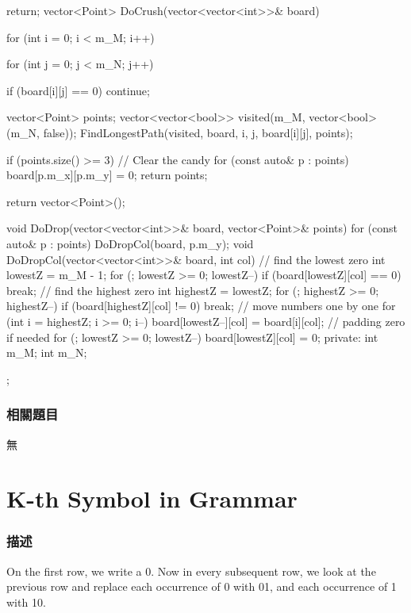 \begin{Code}
{{        return;
    }
    vector<Point> DoCrush(vector<vector<int>>& board)
    {
        for (int i = 0; i < m_M; i++)
        {
            for (int j = 0; j < m_N; j++)
            {
                if (board[i][j] == 0) continue;

                vector<Point> points;
                vector<vector<bool>> visited(m_M, vector<bool>(m_N, false));
                FindLongestPath(visited, board, i, j, board[i][j], points);

                if (points.size() >= 3)
                {
                    // Clear the candy
                    for (const auto& p : points)
                        board[p.m_x][p.m_y] = 0;
                    return points;
                }
            }
        }
        return vector<Point>();
    }
    void DoDrop(vector<vector<int>>& board, vector<Point>& points)
    {
        for (const auto& p : points)
        {
            DoDropCol(board, p.m_y);
        }
    }
    void DoDropCol(vector<vector<int>>& board, int col)
    {
        // find the lowest zero
        int lowestZ = m_M - 1;
        for (; lowestZ >= 0; lowestZ--)
            if (board[lowestZ][col] == 0) break;
        // find the highest zero
        int highestZ = lowestZ;
        for (; highestZ >= 0; highestZ--)
            if (board[highestZ][col] != 0) break;
        // move numbers one by one
        for (int i = highestZ; i >= 0; i--)
            board[lowestZ--][col] = board[i][col];
        // padding zero if needed
        for (; lowestZ >= 0; lowestZ--)
            board[lowestZ][col] = 0;
    }
private:
    int m_M;
    int m_N;
};
\end{Code}


\subsubsection{相關題目}
\begindot
\item 無
\myenddot

\section{K-th Symbol in Grammar}
\label{sec:kth-symbol-in-grammar}

\subsubsection{描述}
On the first row, we write a 0. Now in every subsequent row, we look at the previous row and replace each occurrence of 0 with 01, and each occurrence of 1 with 10.

